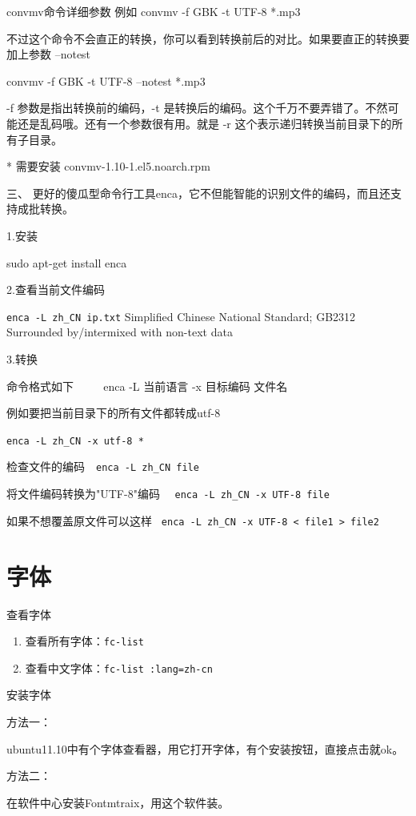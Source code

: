 {convmv命令详细参数 
 例如
convmv -f GBK -t UTF-8 *.mp3

不过这个命令不会直正的转换，你可以看到转换前后的对比。如果要直正的转换要加上参数 --notest

convmv -f GBK -t UTF-8 --notest *.mp3

-f 参数是指出转换前的编码，-t 是转换后的编码。这个千万不要弄错了。不然可能还是乱码哦。还有一个参数很有用。就是 -r 这个表示递归转换当前目录下的所有子目录。

* 需要安装 convmv-1.10-1.el5.noarch.rpm  

三、  更好的傻瓜型命令行工具enca，它不但能智能的识别文件的编码，而且还支持成批转换。  　　

1.安装  　　

sudo apt-get install enca  　　

2.查看当前文件编码  　　

\verb|enca -L zh_CN ip.txt|     Simplified Chinese National Standard; GB2312     Surrounded by/intermixed with non-text data  　　

3.转换  　　

命令格式如下  　　
enca -L 当前语言 -x 目标编码 文件名  　　

例如要把当前目录下的所有文件都转成utf-8  　　

\verb|enca -L zh_CN -x utf-8 * |

检查文件的编码　\verb|enca -L zh_CN file|   　　

 将文件编码转换为"UTF-8"编码　 \verb|enca -L zh_CN -x UTF-8 file|

如果不想覆盖原文件可以这样        \verb| enca -L zh_CN -x UTF-8 < file1 > file2 |



\section{字体}
查看字体
\begin{enumerate}
\item 查看所有字体：\verb*|fc-list|
\item 查看中文字体：\verb*|fc-list :lang=zh-cn|
\end{enumerate}

安装字体

方法一：

ubuntu11.10中有个字体查看器，用它打开字体，有个安装按钮，直接点击就ok。

方法二：

在软件中心安装Fontmtraix，用这个软件装。

}
